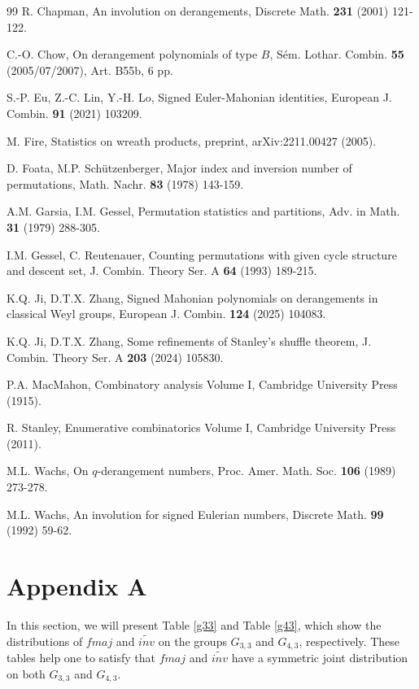 \documentclass[a4paper,12pt]{article}
\begin{document}
\begin{thebibliography}{99}
 R. Chapman, An involution on derangements, Discrete Math. \textbf{231} (2001) 121-122.

 C.-O. Chow, On derangement polynomials of type $B$, S\'em. Lothar. Combin. \textbf{55} (2005/07/2007), Art. B55b, 6 pp.

 S.-P. Eu, Z.-C. Lin, Y.-H. Lo, Signed Euler-Mahonian identities, European J. Combin. \textbf{91} (2021) 103209.

 M. Fire, Statistics on wreath products, preprint, arXiv:2211.00427 (2005).

 D. Foata, M.P. Sch\"utzenberger, Major index and inversion number of permutations, Math. Nachr. \textbf{83} (1978) 143-159.

 A.M. Garsia, I.M. Gessel, Permutation statistics and partitions, Adv. in Math.
\textbf{31} (1979) 288-305.

 I.M. Gessel, C. Reutenauer, Counting permutations with given cycle structure
and descent set, J. Combin. Theory Ser. A \textbf{64} (1993) 189-215.

  K.Q. Ji, D.T.X. Zhang, Signed Mahonian polynomials on derangements in classical Weyl groups, European J. Combin. \textbf{124} (2025) 104083. 

  K.Q. Ji, D.T.X. Zhang, Some refinements of Stanley's shuffle theorem, J. Combin. Theory Ser. A \textbf{203} (2024) 105830. 	

 P.A. MacMahon, Combinatory analysis Volume I, Cambridge University Press (1915).

 R. Stanley, Enumerative combinatorics Volume I, Cambridge University Press (2011).

 M.L. Wachs, On $q$-derangement numbers, Proc. Amer. Math. Soc. \textbf{106} (1989) 273-278.

 M.L. Wachs, An involution for signed Eulerian numbers, Discrete Math. \textbf{99} (1992) 59-62.

\end{thebibliography}


\section{Appendix A}
 In this section, we will present Table \ref{g33} and Table \ref{g43}, which show the distributions of $fmaj$ and $\widetilde{inv}$ on the groups $G_{3,3}$ and $G_{4,3}$, respectively. These tables help one to satisfy that $fmaj$ and $\widetilde{inv}$ have a symmetric joint distribution on both $G_{3,3}$ and $G_{4,3}$.
\end{document}

